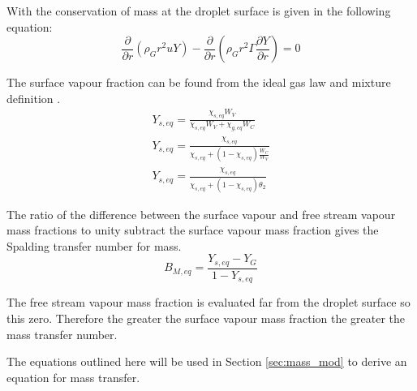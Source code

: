 \documentclass[../Interim_Report_Master]{subfiles}
\begin{document}
With the conservation of mass at the droplet surface is given in the following equation:
\begin{equation}
\frac{\partial}{\partial r}(\rho_G r^2 u Y ) - \frac{\partial}{\partial r}(\rho_G r^2 \Gamma \frac{\partial Y}{\partial r}) = 0
\end{equation}

The surface vapour fraction can be found from the ideal gas law and mixture definition \cite{ladommatos1996}.
\begin{subequations}
\begin{align}
Y_{s,eq} = \frac{\chi_{s,eq}W_V}{\chi_{s,eq}W_V + \chi_{g,eq}W_C} \\
Y_{s,eq} = \frac{\chi_{s,eq}}{\chi_{s,eq} + (1-\chi_{s,eq})\frac{W_C}{W_V}} \\
Y_{s,eq} = \frac{\chi_{s,eq}}{\chi_{s,eq} + (1-\chi_{s,eq})\theta_2} 
\end{align}
\end{subequations}

The ratio of the difference between the surface vapour and free stream vapour mass fractions to unity subtract the surface vapour mass fraction gives the Spalding transfer number for mass.
\begin{equation}
B_{M,eq} = \frac{Y_{s,eq}-Y_G}{1-Y_{s,eq}}
\end{equation}

The free stream vapour mass fraction is evaluated far from the droplet surface so this zero. Therefore the greater the surface vapour mass fraction the greater the mass transfer number. 


The equations outlined here will be used in Section \ref{sec:mass_mod} to derive an equation for mass transfer.

%
%
%
%
%
%
\end{document}

